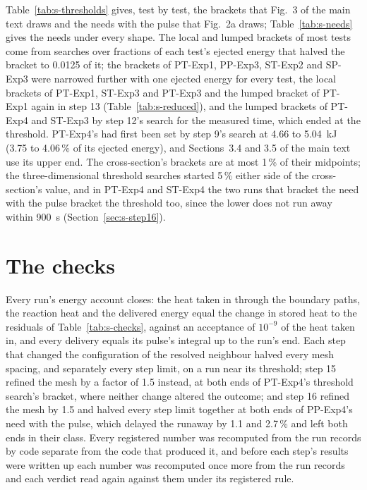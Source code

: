 \documentclass[preprint,12pt]{elsarticle}
\begin{document}
Table~\ref{tab:s-thresholds} gives, test by test, the brackets that Fig.~3 of the main text draws and the needs with the pulse that Fig.~2a draws; Table~\ref{tab:s-needs} gives the needs under every shape. The local and lumped brackets of most tests come from searches over fractions of each test's ejected energy that halved the bracket to 0.0125 of it; the brackets of PT-Exp1, PP-Exp3, ST-Exp2 and SP-Exp3 were narrowed further with one ejected energy for every test, the local brackets of PT-Exp1, ST-Exp3 and PT-Exp3 and the lumped bracket of PT-Exp1 again in step 13 (Table~\ref{tab:s-reduced}), and the lumped brackets of PT-Exp4 and ST-Exp3 by step 12's search for the measured time, which ended at the threshold. PT-Exp4's had first been set by step 9's search at 4.66 to 5.04~kJ (3.75 to 4.06\,\% of its ejected energy), and Sections~3.4 and 3.5 of the main text use its upper end. The cross-section's brackets are at most 1\,\% of their midpoints; the three-dimensional threshold searches started 5\,\% either side of the cross-section's value, and in PT-Exp4 and ST-Exp4 the two runs that bracket the need with the pulse bracket the threshold too, since the lower does not run away within 900~s (Section~\ref{sec:s-step16}).


\section{The checks}
\label{sec:s-checks}

Every run's energy account closes: the heat taken in through the boundary paths, the reaction heat and the delivered energy equal the change in stored heat to the residuals of Table~\ref{tab:s-checks}, against an acceptance of $10^{-9}$ of the heat taken in, and every delivery equals its pulse's integral up to the run's end. Each step that changed the configuration of the resolved neighbour halved every mesh spacing, and separately every step limit, on a run near its threshold; step 15 refined the mesh by a factor of 1.5 instead, at both ends of PT-Exp4's threshold search's bracket, where neither change altered the outcome; and step 16 refined the mesh by 1.5 and halved every step limit together at both ends of PP-Exp4's need with the pulse, which delayed the runaway by 1.1 and 2.7\,\% and left both ends in their class. Every registered number was recomputed from the run records by code separate from the code that produced it, and before each step's results were written up each number was recomputed once more from the run records and each verdict read again against them under its registered rule.
\end{document}
